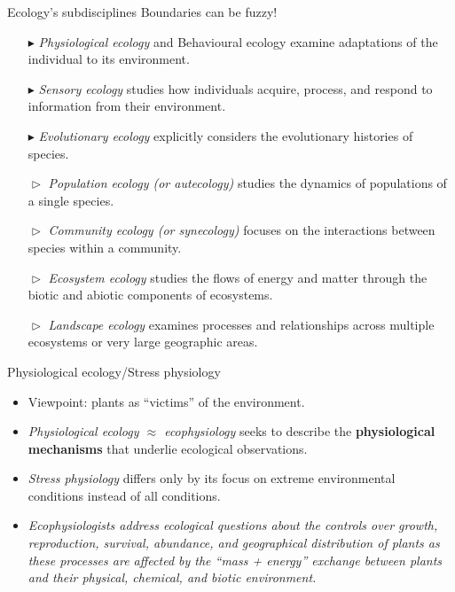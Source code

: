\documentclass[10pt]{beamer}
\begin{document}
\begin{frame}{Ecology's subdisciplines}
    \Attention Boundaries can be fuzzy!

    \begin{itemize}
        \item[$\blacktriangleright$] \emph{Physiological ecology} and
        Behavioural ecology examine adaptations of the individual
        to its environment.
        \item[$\blacktriangleright$] \emph{Sensory ecology} studies how individuals acquire, process, and respond to information from their environment.
        \item[$\blacktriangleright$] \emph{Evolutionary ecology} explicitly considers the evolutionary histories of species.
        \item[$\vartriangleright$] \emph{Population ecology (or autecology)} studies the dynamics of populations of a single species.
        \item[$\vartriangleright$] \emph{Community ecology (or synecology)} focuses on the interactions between species within a community.
        \item[$\vartriangleright$] \emph{Ecosystem ecology} studies the flows of energy and matter through the biotic and abiotic components of ecosystems.
        \item[$\vartriangleright$] \emph{Landscape ecology} examines processes and relationships across multiple ecosystems or very large geographic areas.
    \end{itemize}

\end{frame}

\begin{frame}{Physiological ecology/Stress physiology}
    \begin{itemize}
        \item Viewpoint: plants as ``victims'' of the environment.
        \item \emph{Physiological ecology $\approx$ ecophysiology} seeks to describe the
        \textbf{physiological mechanisms} that underlie ecological
        observations.
        \item \emph{Stress physiology} differs only by its focus on extreme environmental conditions instead of all conditions.
        \item \emph{Ecophysiologists address ecological questions about
        the controls over growth, reproduction, survival, abundance,
        and geographical distribution of plants as these processes
        are affected by the ``mass + energy'' exchange between plants and their
        physical, chemical, and biotic environment.}
    \end{itemize}
\end{frame}
\end{document}
